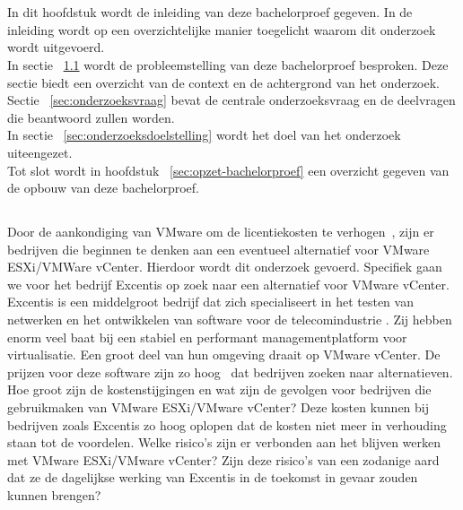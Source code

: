 
\chapter{}%
\label{ch:inleiding}
In dit hoofdstuk wordt de inleiding van deze bachelorproef gegeven. In de inleiding wordt op een overzichtelijke manier toegelicht waarom dit onderzoek wordt uitgevoerd.\\
In sectie ~\ref{sec:probleemstelling} wordt de probleemstelling van deze bachelorproef besproken. Deze sectie biedt een overzicht van de context en de achtergrond van het onderzoek.\\
Sectie ~\ref{sec:onderzoeksvraag} bevat de centrale onderzoeksvraag en de deelvragen die beantwoord zullen worden.\\
In sectie ~\ref{sec:onderzoeksdoelstelling} wordt het doel van het onderzoek uiteengezet.\\
Tot slot wordt in hoofdstuk ~\ref{sec:opzet-bachelorproef} een overzicht gegeven van de opbouw van deze bachelorproef.

\section{}%
\label{sec:probleemstelling}

Door de aankondiging van VMware om de licentiekosten te verhogen~\autocite{device42_2024}, zijn er bedrijven die beginnen te denken aan een eventueel alternatief voor VMware ESXi/VMWare vCenter.
Hierdoor wordt dit onderzoek gevoerd. Specifiek gaan we voor het bedrijf Excentis op zoek naar een alternatief voor VMware vCenter.
Excentis is een middelgroot bedrijf dat zich specialiseert in het testen van netwerken en het ontwikkelen van software voor de telecomindustrie \autocite{excentis2025}.
Zij hebben enorm veel baat bij een stabiel en performant managementplatform voor virtualisatie. Een groot deel van hun omgeving draait op VMware vCenter.
De prijzen voor deze software zijn zo hoog~\autocite{Hale2024} dat bedrijven zoeken naar alternatieven.
Hoe groot zijn de kostenstijgingen en wat zijn de gevolgen voor bedrijven die gebruikmaken van VMware ESXi/VMware vCenter?
Deze kosten kunnen bij bedrijven zoals Excentis zo hoog oplopen dat de kosten niet meer in verhouding staan tot de voordelen.
Welke risico's zijn er verbonden aan het blijven werken met VMware ESXi/VMware vCenter?
Zijn deze risico’s van een zodanige aard dat ze de dagelijkse werking van Excentis in de toekomst in gevaar zouden kunnen brengen?

